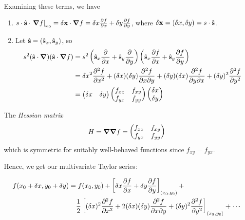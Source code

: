 \documentclass{../template/note}
\begin{document}
    Examining these terms, we have
    \begin{enumerate}[label=\protect\circled{\arabic*}]
        \item \(s \cdot \hvec s \cdot \left.\grad f\right|_{x_0} = \delta \vec x \cdot \grad f = \delta x \pd f x + \delta y \pd f y\), where \(\delta \vec x = (\delta x, \delta y) = s \cdot \hvec s\).
        \item Let \(\hvec s = (\hvec s_x, \hvec s_y)\), so
        \begin{align*}
            s^2 (\hvec s \cdot \grad)(\hvec s \cdot \grad f) &= s^2\left(\hvec s_x \pd{}{x} + \hvec s_y \pd{}{y}\right)\left(\hvec s_x \pd{f}{x} + \hvec s_y \pd{f}{y}\right) \\
            &= {\delta x}^2 \pd{^2f}{x^2} + (\delta x)(\delta y) \pd{^2f}{x \partial y} + (\delta y)(\delta x) \pd{^2f}{y \partial x} + (\delta y)^2 \pd{^2f}{y^2} \\
            &= \begin{pmatrix}
             \delta x & \delta y \\
            \end{pmatrix} \begin{pmatrix}
             f_{xx} & f_{xy} \\
             f_{yx} & f_{yy} \\
            \end{pmatrix} \begin{pmatrix}
             \delta x \\
             \delta y \\
            \end{pmatrix}
        \end{align*}
    \end{enumerate}
    
    \begin{definition}
        The \emph{Hessian matrix}
        \[
            H = \grad \grad f = \begin{pmatrix}
             f_{xx} & f_{xy} \\
             f_{yx} & f_{yy} \\
            \end{pmatrix}
        \]
        which is symmetric for suitably well-behaved functions since \(f_{xy} = f_{yx}\).
    \end{definition}
    
    Hence, we get our multivariate Taylor series:

    \begin{align*}
        f(x_0 + \delta x, y_0 + \delta y) =&\; f(x_0, y_0) + \left[\delta x \pd f x + \delta y \pd f y\right]_{(x_0,y_0)} + \\ &\frac{1}{2}\left[(\delta x)^2 \pd{^2f}{x^2} + 2(\delta x)(\delta y)\pd{^2f}{x \partial y} + (\delta y)^2 \pd{^2f}{y^2}\right]_{(x_0, y_0)} + \cdots \\
    \end{align*}
    
\end{document}
